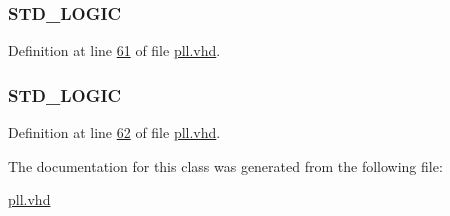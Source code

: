 \subsubsection[{sub\+\_\+wire4}]{ {\bfseries \textcolor{comment}{S\+T\+D\+\_\+\+L\+O\+G\+I\+C}\textcolor{vhdlchar}{ }} \hspace{0.3cm}{\ttfamily [Signal]}}\label{classpll_1_1_s_y_n_a1743b96eadf0499d106535e1a9241b2a}


Definition at line \hyperlink{pll_8vhd_source_l00061}{61} of file \hyperlink{pll_8vhd_source}{pll.\+vhd}.

\hypertarget{classpll_1_1_s_y_n_a428d095cdf1fa14d47c103e910135ebb}{}
\subsubsection[{sub\+\_\+wire5}]{ {\bfseries \textcolor{comment}{S\+T\+D\+\_\+\+L\+O\+G\+I\+C}\textcolor{vhdlchar}{ }} \hspace{0.3cm}{\ttfamily [Signal]}}\label{classpll_1_1_s_y_n_a428d095cdf1fa14d47c103e910135ebb}


Definition at line \hyperlink{pll_8vhd_source_l00062}{62} of file \hyperlink{pll_8vhd_source}{pll.\+vhd}.



The documentation for this class was generated from the following file\+:\begin{DoxyCompactItemize}
\item 
\hyperlink{pll_8vhd}{pll.\+vhd}\end{DoxyCompactItemize}
